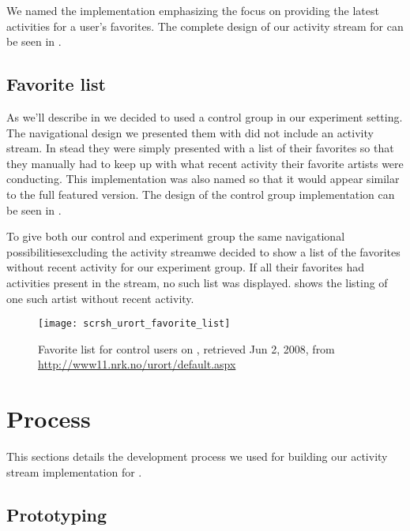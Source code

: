 We named the implementation
\latest{}\dash{}emphasizing the focus on providing the latest activities
for a user's favorites.
The complete design of our activity stream for \urort{} can be seen in
.

\subsection{Favorite list}
\label{section:implementation.design.favorite.list}

As we'll describe in
we decided to used a control group in our experiment setting. The navigational
design we presented them with did not include an activity stream. In stead
they
were simply presented with a list of their favorites so that they manually had
to keep up with what recent activity their favorite artists were conducting.
This implementation was also named \latest{} so that it would appear similar
to the full featured version.
The design of the control group implementation can be seen in
.

To give both our control and experiment group the same navigational
possibilities\dash{}excluding the activity stream\dash{}we decided to show a
list of the favorites without recent activity for our experiment group. If all
their favorites had activities present in the stream, no such list was
displayed.  shows the listing of one
such artist without recent activity.

\begin{figure}
  \texttt{[image: scrsh\_urort\_favorite\_list]}
  \caption[\urort{} Favorite List]{
    Favorite list for control users on \urort{},
    retrieved Jun 2, 2008, from
    \url{http://www11.nrk.no/urort/default.aspx}
  }
  \label{figure:scrsh.urort.favorite.list}
\end{figure}

\section{Process}

This sections details the development process we used for building our
activity stream implementation for \urort{}.

\subsection{Prototyping}

